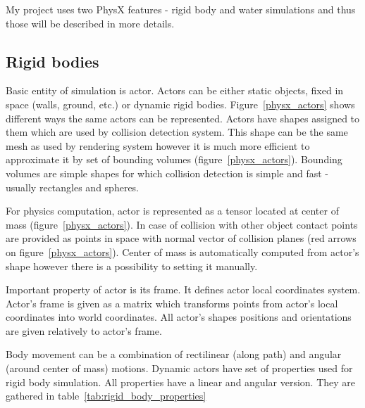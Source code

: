 
My project uses two PhysX features - rigid body and water simulations and thus those will be described in more details. 

\subsection{Rigid bodies}

Basic entity of simulation is actor. Actors can be either static objects, fixed in space (walls, ground, etc.) or dynamic rigid bodies.
Figure~\ref{physx_actors} shows different ways the same actors can be represented. Actors have shapes assigned to them which are used by collision detection system. This shape can be the same mesh as used by rendering system however it is much more efficient to approximate it by set of bounding volumes (figure~\ref{physx_actors}). Bounding volumes are simple shapes for which collision detection is simple and fast - usually rectangles and spheres. 

For physics computation, actor is represented as a tensor located at center of mass (figure~\ref{physx_actors}). In case of collision with other object contact points are provided as points in space with normal vector of collision planes (red arrows on figure~\ref{physx_actors}). Center of mass is automatically computed from actor's shape however there is a possibility to setting it manually.

Important property of actor is its frame. It defines actor local coordinates system. Actor's frame is given as a matrix which transforms points from actor's local coordinates into world coordinates. All actor's shapes positions and orientations are given relatively to actor's frame.

Body movement can be a combination of rectilinear (along path) and angular (around center of mass) motions. Dynamic actors have set of properties used for rigid body simulation. All properties have a linear and angular version. They are gathered in table~\ref{tab:rigid_body_properties}

